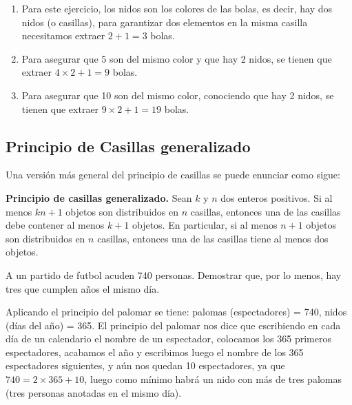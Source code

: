 \documentclass[12pt]{article}
\begin{document}
\begin{solucion} \hfill
    \renewcommand{\labelenumi}{\alph{enumi})}
    \begin{enumerate}
        \item Para este ejercicio, los nidos son los colores de las bolas, es decir, hay dos nidos (o casillas), para garantizar dos elementos en la misma casilla necesitamos extraer $2+1=3$ bolas.
        \item Para asegurar que 5 son del mismo color y que hay 2 nidos, se tienen que extraer $4 \times 2+1=9$ bolas.
        \item Para asegurar que 10 son del mismo color, conociendo que hay 2 nidos, se tienen que extraer $9 \times 2+1=19$ bolas.
    \end{enumerate}
    
\end{solucion}

\subsection{Principio de Casillas generalizado}

Una versión más general del principio de casillas se puede enunciar como sigue:

\begin{teorema}
    \textbf{Principio de casillas generalizado.} Sean $k$ y $n$ dos enteros positivos.  Si al menos $kn+1$ objetos son distribuidos en $n$ casillas, entonces una de las casillas debe contener al menos $k+1$ objetos.  En particular, si al menos $n+1$ objetos son distribuidos en $n$ casillas, entonces una de las casillas tiene al menos dos objetos.
\end{teorema}

\begin{ejemplo}
    A un partido de futbol acuden 740 personas. Demostrar que, por lo menos, hay tres que cumplen años el mismo día.
\end{ejemplo}

\begin{solucion}
    Aplicando el principio del palomar se tiene:
    palomas (espectadores) = 740,
    nidos (días del año) = 365.
    El principio del palomar nos dice que escribiendo en cada día de un calendario el nombre de un espectador, colocamos los 365 primeros espectadores, acabamos el año y escribimos luego el nombre de los 365 espectadores siguientes, y aún nos quedan 10 espectadores, ya que $740=2 \times 365+10$, luego como mínimo habrá un nido con más de tres palomas (tres personas anotadas en el mismo día).
\end{solucion}
\end{document}
